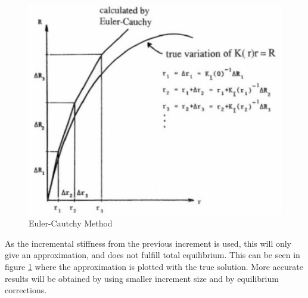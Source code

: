 \begin{figure}[H]
\centering
\includegraphics[scale=1]{figures/euler}
\caption[$\; \:$Euler-Cautchy Method]{Euler-Cautchy Method  \cite{moan2003} }
 \label{fig:euler}
\end{figure}
\noindent As the incremental stiffness from the previous increment is used, this will only give an approximation, and does not fulfill total equilibrium. This can be seen in figure \ref{fig:euler} where the approximation is plotted with the true solution. More accurate results will be obtained by using smaller increment size and by equilibrium corrections. 
